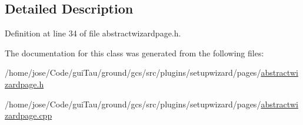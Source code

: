 \subsection{Detailed Description}


Definition at line 34 of file abstractwizardpage.\-h.



The documentation for this class was generated from the following files\-:\begin{DoxyCompactItemize}
\item 
/home/jose/\-Code/gui\-Tau/ground/gcs/src/plugins/setupwizard/pages/\hyperlink{abstractwizardpage_8h}{abstractwizardpage.\-h}\item 
/home/jose/\-Code/gui\-Tau/ground/gcs/src/plugins/setupwizard/pages/\hyperlink{abstractwizardpage_8cpp}{abstractwizardpage.\-cpp}\end{DoxyCompactItemize}
